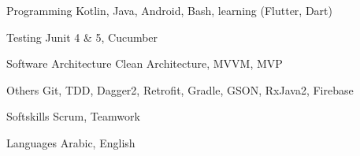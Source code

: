 
\begin{cvskills}

  \cvskill
    {Programming} %
    {Kotlin, Java, Android, Bash, learning (Flutter, Dart)} %

  \cvskill
    {Testing} %
    {Junit 4 \& 5, Cucumber} %

  \cvskill
    {Software Architecture} %
    {Clean Architecture, MVVM, MVP} %

  \cvskill
    {Others} %
    {Git, TDD, Dagger2, Retrofit, Gradle, GSON, RxJava2, Firebase} %

  \cvskill
    {Softskills} %
    {Scrum, Teamwork} %

  \cvskill
    {Languages} %
    {Arabic, English} %

\end{cvskills}